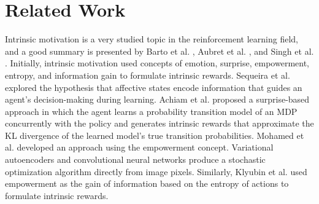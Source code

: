 \section{Related Work}
\label{sec:related_work}



Intrinsic motivation is a very studied topic in the reinforcement learning field, and a good summary is presented by Barto et al. \cite{barto2013intrinsic}, Aubret et al. \cite{aubret2019survey}, and Singh et al. \cite{singh2010intrinsically}. Initially, intrinsic motivation used concepts of emotion, surprise, empowerment, entropy, and information gain to formulate intrinsic rewards. Sequeira et al. \cite{sequeira2011emotion} explored the hypothesis that affective states encode information that guides an agent's decision-making during learning. Achiam et al. \cite{achiam2017surprise} proposed a surprise-based approach in which the agent learns a probability transition model of an MDP concurrently with the policy and generates intrinsic rewards that approximate the KL divergence of the learned model's true transition probabilities. Mohamed et al. \cite{mohamed2015variational} developed an approach using the empowerment concept. Variational autoencoders and convolutional neural networks produce a stochastic optimization algorithm directly from image pixels. Similarly, Klyubin et al. \cite{klyubin2005empowerment} used empowerment as the gain of information based on the entropy of actions to formulate intrinsic rewards.



